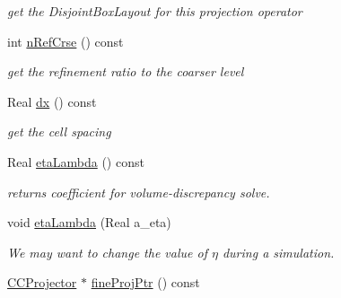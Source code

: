 \begin{DoxyCompactItemize}
\begin{DoxyCompactList}\small\item\em get the Disjoint\-Box\-Layout for this projection operator \end{DoxyCompactList}\item 
\hypertarget{class_c_c_projector_a4d0ad1e561b567a441489b9b9c79b643}{int \hyperlink{class_c_c_projector_a4d0ad1e561b567a441489b9b9c79b643}{n\-Ref\-Crse} () const }\label{class_c_c_projector_a4d0ad1e561b567a441489b9b9c79b643}

\begin{DoxyCompactList}\small\item\em get the refinement ratio to the coarser level \end{DoxyCompactList}\item 
\hypertarget{class_c_c_projector_a9d32bc92bfb6968b683fb750686e1167}{Real \hyperlink{class_c_c_projector_a9d32bc92bfb6968b683fb750686e1167}{dx} () const }\label{class_c_c_projector_a9d32bc92bfb6968b683fb750686e1167}

\begin{DoxyCompactList}\small\item\em get the cell spacing \end{DoxyCompactList}\item 
\hypertarget{class_c_c_projector_a1c63bccce1cf3b8207604bc75ea5c9de}{Real \hyperlink{class_c_c_projector_a1c63bccce1cf3b8207604bc75ea5c9de}{eta\-Lambda} () const }\label{class_c_c_projector_a1c63bccce1cf3b8207604bc75ea5c9de}

\begin{DoxyCompactList}\small\item\em returns coefficient for volume-\/discrepancy solve. \end{DoxyCompactList}\item 
\hypertarget{class_c_c_projector_a22c8a042effcc631045f8987227dc698}{void \hyperlink{class_c_c_projector_a22c8a042effcc631045f8987227dc698}{eta\-Lambda} (Real a\-\_\-eta)}\label{class_c_c_projector_a22c8a042effcc631045f8987227dc698}

\begin{DoxyCompactList}\small\item\em We may want to change the value of $ \eta $ during a simulation. \end{DoxyCompactList}\item 
\hypertarget{class_c_c_projector_a10b37341aaded18ecf01e1cb34dcd479}{\hyperlink{class_c_c_projector}{C\-C\-Projector} $\ast$ \hyperlink{class_c_c_projector_a10b37341aaded18ecf01e1cb34dcd479}{fine\-Proj\-Ptr} () const }\label{class_c_c_projector_a10b37341aaded18ecf01e1cb34dcd479}


\end{DoxyCompactItemize}

